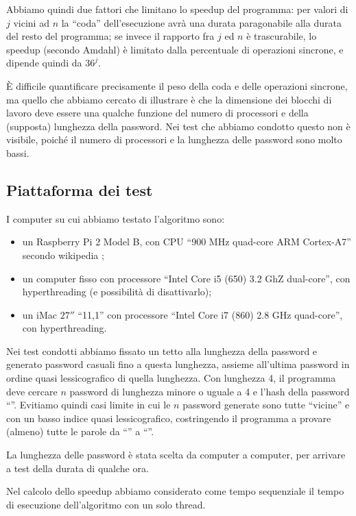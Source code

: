 \documentclass[]{myarticle}
\begin{document}
Abbiamo quindi due fattori che limitano lo speedup del programma: per valori di $j$ vicini ad $n$ la ``coda'' dell'esecuzione avr\`a una durata paragonabile alla durata del resto del programma; se invece il rapporto fra $j$ ed $n$ \`e trascurabile, lo speedup (secondo Amdahl) \`e limitato dalla percentuale di operazioni sincrone, e dipende quindi da $36^{j}$.

\`E difficile quantificare precisamente il peso della coda e delle operazioni sincrone, ma quello che abbiamo cercato di illustrare \`e che la dimensione dei blocchi di lavoro deve essere una qualche funzione del numero di processori e della (supposta) lunghezza della password.
Nei test che abbiamo condotto questo non \`e visibile, poich\'e il numero di processori e la lunghezza delle password sono molto bassi.

\subsection{Piattaforma dei test}

I computer su cui abbiamo testato l'algoritmo sono:
\begin{itemize}
	\item un Raspberry Pi 2 Model B, con CPU ``900 MHz quad-core ARM Cortex-A7'' secondo wikipedia \cite{wikipi};
	\item un computer fisso con processore ``Intel Core i5 (650) 3.2 GhZ dual-core'', con hyperthreading (e possibilit\`a di disattivarlo);
	\item un iMac $27''$ ``11,1'' con processore ``Intel Core i7 (860) 2.8 GHz quad-core'', con hyperthreading.
\end{itemize}

Nei test condotti abbiamo fissato un tetto alla lunghezza della password e generato password casuali fino a questa lunghezza, assieme all'ultima password in ordine quasi lessicografico di quella lunghezza.
Con lunghezza 4, il programma deve cercare $n$ password di lunghezza minore o uguale a 4 e l'hash della password ``''.
Evitiamo quindi casi limite in cui le $n$ password generate sono tutte ``vicine'' e con un basso indice quasi lessicografico, costringendo il programma a provare (almeno) tutte le parole da ``'' a ``''.

La lunghezza delle password \`e stata scelta da computer a computer, per arrivare a test della durata di qualche ora.

Nel calcolo dello speedup abbiamo considerato come tempo sequenziale il tempo di esecuzione dell'algoritmo con un solo thread.
\end{document}
